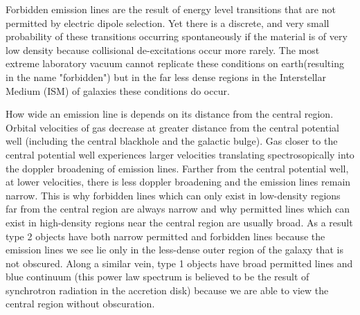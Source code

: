 \documentclass[preprint]{aastex}
\begin{document}
Forbidden emission lines are the result of energy level transitions that are not permitted by electric dipole selection.  Yet there is a discrete, and very small probability of these transitions occurring spontaneously if the material is of very low density because collisional de-excitations occur more rarely.  The most extreme laboratory vacuum cannot replicate these conditions on earth(resulting in the name "forbidden") but in the far less dense regions in the Interstellar Medium (ISM) of galaxies these conditions do occur.   

How wide an emission line is depends on its distance from the central region.  Orbital velocities of gas decrease at greater distance from the central potential well (including the central blackhole and the galactic bulge).  Gas closer to the central potential well experiences larger velocities translating spectrosopically into the doppler broadening of emission lines.  Farther from the central potential well, at lower velocities, there is less doppler broadening and the emission lines remain narrow.  This is why forbidden lines which can only exist in low-density regions far from the central region are always narrow and why permitted lines which can exist in high-density regions near the central region are usually broad.  As a result type 2 objects have both narrow permitted and forbidden lines because the emission lines we see lie only in the less-dense outer region of the galaxy that is not obscured. Along a similar vein, type 1 objects have broad permitted lines and blue continuum (this power law spectrum is believed to be the result of synchrotron radiation in the accretion disk) because we are able to view the central region without obscuration\citep{hassen}.     
\end{document}
